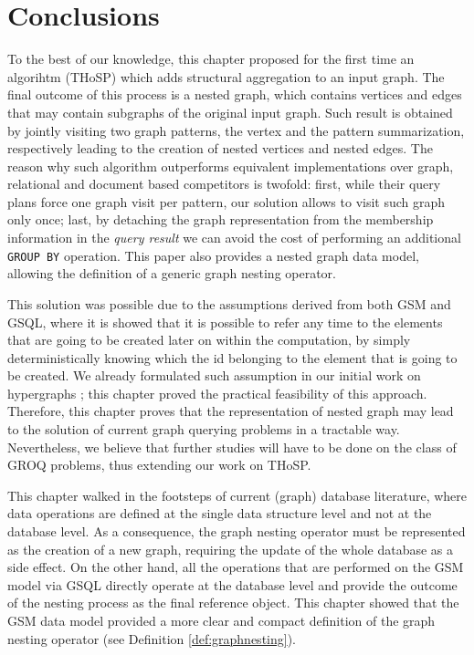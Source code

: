 \section{Conclusions}

To the best of our knowledge, this chapter proposed for the first time an algorihtm (THoSP) which adds structural aggregation to an input graph. The final outcome of this process is a nested graph, which contains vertices and edges that may contain subgraphs of the original input graph. Such result is obtained by jointly visiting two graph patterns, the vertex and the pattern summarization, respectively leading to the creation of nested vertices and nested edges. The reason why such algorithm outperforms equivalent implementations over graph, relational and document based competitors is twofold: first, while their query plans force one graph visit per pattern, our solution allows to visit such graph only once; last, by detaching the graph representation from the membership information in the \textit{query result} we can avoid the cost of performing an additional \texttt{GROUP BY} operation. This paper also provides a nested graph data model, allowing the definition of a generic graph nesting operator.

This solution was possible due to the assumptions derived from both GSM and GSQL, where it is showed that it is possible to refer any time to the elements that are going to be created later on within the computation, by simply deterministically knowing which the id belonging to the element that is going to be created. We already formulated such  assumption in our initial work on hypergraphs \cite{bergami2014}; this chapter proved the practical feasibility of this approach. Therefore, this chapter proves that the representation of nested graph may lead to the solution of current graph querying problems in a tractable way. Nevertheless, we believe that further studies will have to be done on the class of  GROQ problems, thus extending our work on THoSP.

This chapter walked in the footsteps of current (graph) database literature, where data operations are defined  at the single data structure level and not at the database level. As a consequence, the graph nesting operator must be represented as the creation of a new graph, requiring the update of the whole database as a side effect. On the other hand, all the operations that are performed on the GSM model via GSQL directly operate at the database level and provide the outcome of the nesting process as the final reference object. This chapter showed that the GSM data model provided a more clear and compact definition of the graph nesting operator (see Definition \vref{def:graphnesting}).

